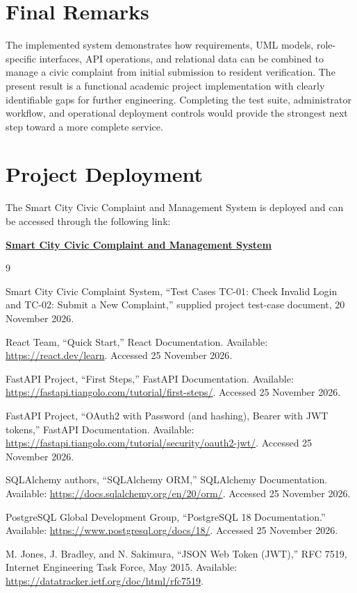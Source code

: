 \documentclass[12pt,a4paper]{report}
\begin{document}
\section{Final Remarks}

The implemented system demonstrates how requirements, UML models, role-specific interfaces, API operations, and relational data can be combined to manage a civic complaint from initial submission to resident verification. The present result is a functional academic project implementation with clearly identifiable gaps for further engineering. Completing the test suite, administrator workflow, and operational deployment controls would provide the strongest next step toward a more complete service.


\section{Project Deployment}

The Smart City Civic Complaint and Management System is deployed
and can be accessed through the following link:

\begin{center}
\href{https://smartcitycivic.netlify.app}
{\textbf{\underline{Smart City Civic Complaint and Management System}}}
\end{center}


\begin{thebibliography}{9}

Smart City Civic Complaint System, ``Test Cases TC-01: Check Invalid Login and
TC-02: Submit a New Complaint,'' supplied project test-case document,
20 November 2026.

React Team, ``Quick Start,'' React Documentation. Available: \url{https://react.dev/learn}. Accessed 25 November 2026.

FastAPI Project, ``First Steps,'' FastAPI Documentation. Available: \url{https://fastapi.tiangolo.com/tutorial/first-steps/}. Accessed 25 November 2026.

FastAPI Project, ``OAuth2 with Password (and hashing), Bearer with JWT tokens,'' FastAPI Documentation. Available: \url{https://fastapi.tiangolo.com/tutorial/security/oauth2-jwt/}. Accessed 25 November 2026.

SQLAlchemy authors, ``SQLAlchemy ORM,'' SQLAlchemy Documentation. Available: \url{https://docs.sqlalchemy.org/en/20/orm/}. Accessed 25 November 2026.

PostgreSQL Global Development Group, ``PostgreSQL 18 Documentation.'' Available: \url{https://www.postgresql.org/docs/18/}. Accessed 25 November 2026.

M. Jones, J. Bradley, and N. Sakimura, ``JSON Web Token (JWT),'' RFC 7519, Internet Engineering Task Force, May 2015. Available: \url{https://datatracker.ietf.org/doc/html/rfc7519}.

\end{thebibliography}
\end{document}
